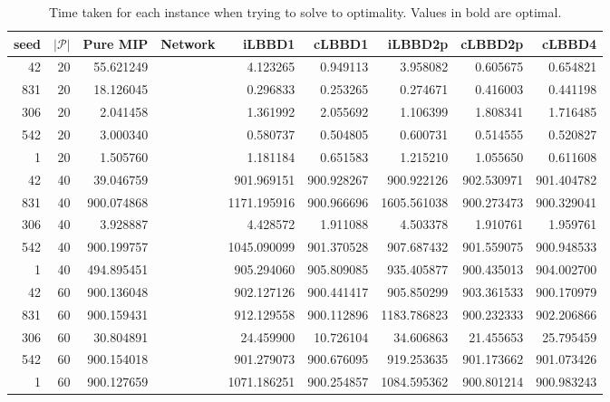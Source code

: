 \begin{table*}
    \centering
    \caption{Time taken for each instance when trying to solve to optimality. Values in bold are optimal.}
    \begin{tabular}{rrrrrrrrr} \toprule
        seed & $|\mathcal{P}|$ & Pure MIP & Network & iLBBD1 & cLBBD1 & iLBBD2p & cLBBD2p & cLBBD4 \\\midrule
        42     &       20    & 55.621249 &       & 4.123265 &  0.949113 & 3.958082 & 0.605675 & 0.654821 \\
       831     &       20    &18.126045 &        & 0.296833 &  0.253265 & 0.274671 & 0.416003 & 0.441198 \\
      306       &     20     &2.041458  &        & 1.361992 & 2.055692 & 1.106399 & 1.808341 & 1.716485 \\
      542       &     20     &3.000340  &       &  0.580737 & 0.504805 & 0.600731 & 0.514555 & 0.520827 \\
        1      &      20     &1.505760  &       & 1.181184 & 0.651583 & 1.215210 & 1.055650 & 0.611608 \\\midrule
       42      &      40    &   39.046759 &   &  901.969151 & 900.928267  & 900.922126 &  902.530971 & 901.404782 \\
     831       &     40    & 900.074868 &     &  1171.195916 & 900.966696 & 1605.561038 &  900.273473 & 900.329041 \\
     306       &     40    &  3.928887 &      &     4.428572  &  1.911088  &   4.503378  &  1.910761  &  1.959761 \\
    542       &     40   & 900.199757 &      &  1045.090099  & 901.370528  & 907.687432 &  901.559075 & 900.948533 \\
     1        &    40  &  494.895451  &      &  905.294060 &  905.809085  &  935.405877 & 900.435013 & 904.002700 \\\midrule
     42       &     60 &  900.136048  &       & 902.127126 &  900.441417  & 905.850299 &  903.361533 &  900.170979 \\
     831      &      60 &  900.159431  &      & 912.129558 & 900.112896 & 1183.786823 &  900.232333 &  902.206866 \\
     306      &      60  &  30.804891 &      &  24.459900  & 10.726104  &  34.606863 &  21.455653 &  25.795459 \\
     542      &      60 & 900.154018 &      &  901.279073 & 900.676095 &  919.253635 & 901.173662 & 901.073426 \\
     1        &    60  & 900.127659 &       & 1071.186251 & 900.254857 & 1084.595362 &  900.801214 & 900.983243 \\
     
     \bottomrule
    \end{tabular}
\end{table*}
